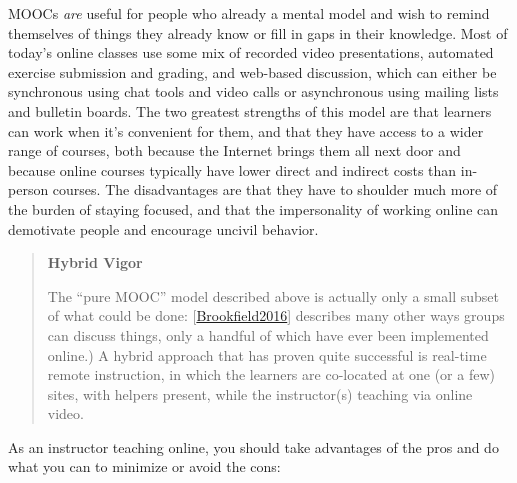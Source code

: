 \documentclass[10pt,statementpaper]{memoir}
\begin{document}
MOOCs \emph{are} useful for people who already a mental model and wish
to remind themselves of things they already know or fill in gaps in
their knowledge. Most of today's online classes use some mix of recorded
video presentations, automated exercise submission and grading, and
web-based discussion, which can either be synchronous using chat tools
and video calls or asynchronous using mailing lists and bulletin boards.
The two greatest strengths of this model are that learners can work when
it's convenient for them, and that they have access to a wider range of
courses, both because the Internet brings them all next door and because
online courses typically have lower direct and indirect costs than
in-person courses. The disadvantages are that they have to shoulder much
more of the burden of staying focused, and that the impersonality of
working online can demotivate people and encourage uncivil behavior.

\begin{quote}
\textbf{Hybrid Vigor}

The ``pure MOOC'' model described above is actually only a small subset
of what could be done:
{[}\href{biblio.html\#brookfield-discussion}{Brookfield2016}{]}
describes many other ways groups can discuss things, only a handful of
which have ever been implemented online.) A hybrid approach that has
proven quite successful is real-time remote instruction, in which the
learners are co-located at one (or a few) sites, with helpers present,
while the instructor(s) teaching via online video.
\end{quote}

As an instructor teaching online, you should take advantages of the pros
and do what you can to minimize or avoid the cons:
\end{document}
